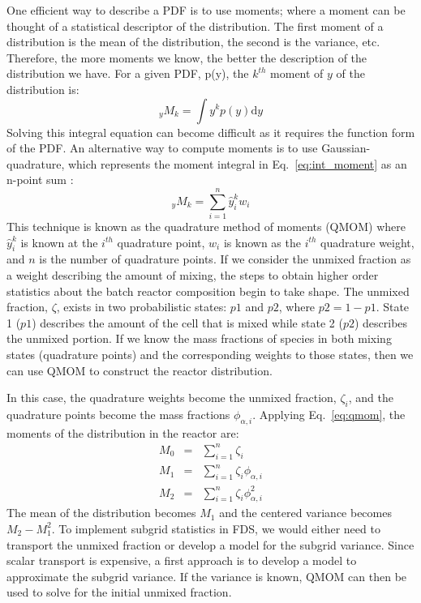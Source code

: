 One efficient way to describe a PDF is to use moments; where a moment can be thought of a statistical descriptor of the distribution. The first moment of a distribution is the mean of the distribution, the second is the variance, etc. Therefore, the more moments we know, the better the description of the distribution we have. For a given PDF, p(y), the $k^{th}$ moment of $y$ of the distribution is:
\begin{equation}\label{eq:int_moment}
_{y}M_{k} = \int y^{k}p(y)\mathrm{d}y
\end{equation}
Solving this integral equation can become difficult as it requires the function form of the PDF. An alternative way to compute moments is to use Gaussian-quadrature, which represents the moment integral in Eq.~\ref{eq:int_moment} as an n-point sum \cite{mcgraw:1997}:
\begin{equation}\label{eq:qmom}
_{y}M_{k}=\displaystyle \sum_{i=1}^{n} \hat y_{i}^{k} w_{i}
\end{equation}
This technique is known as the quadrature method of moments (QMOM) where  $\hat y_i^k$ is known at the $i^{th}$ quadrature point, $w_i$ is known as the $i^{th}$ quadrature weight, and $n$ is the number of quadrature points. If we consider the unmixed fraction as a weight describing the amount of mixing, the steps to obtain higher order statistics about the batch reactor composition begin to take shape. The unmixed fraction, $\zeta$, exists in two probabilistic states: $p1$ and $p2$, where $p2 = 1-p1$. State 1 ($p1$) describes the amount of the cell that is mixed while state 2 ($p2$) describes the unmixed portion. If we know the mass fractions of species in both mixing states (quadrature points) and the corresponding weights to those states, then we can use QMOM to construct the reactor distribution.

In this case, the quadrature weights become the unmixed fraction, $\zeta_{i}$, and the quadrature points become the mass fractions $\phi_{\alpha,i}$. Applying Eq.~\ref{eq:qmom}, the moments of the distribution in the reactor are:
\begin{eqnarray}\label{eq:moments}
M_{0} &=& \displaystyle \sum_{i=1}^{n} \zeta_{i} \\
\nonumber M_{1} &=& \displaystyle \sum_{i=1}^{n} \zeta_{i} \phi_{\alpha,i} \\
\nonumber M_{2} &=& \displaystyle \sum_{i=1}^{n} \zeta_{i} \phi_{\alpha,i}^2
\end{eqnarray}
The mean of the distribution becomes $M_{1}$ and the centered variance becomes $M_{2}-M_{1}^{2}$. To implement subgrid statistics in FDS, we would either need to transport the unmixed fraction or develop a model for the subgrid variance. Since scalar transport is expensive, a first approach is to develop a model to approximate the subgrid variance. If the variance is known, QMOM can then be used to solve for the initial unmixed fraction.    


